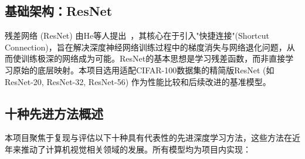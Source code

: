\documentclass[a4paper]{article}
\begin{document}
\subsection{基础架构：ResNet}
残差网络 (ResNet) 由He等人提出~\cite{he2016deep}，其核心在于引入"快捷连接"(Shortcut Connection)，旨在解决深度神经网络训练过程中的梯度消失与网络退化问题，从而使训练极深的网络成为可能。ResNet的基本思想是学习残差函数，而非直接学习原始的底层映射。本项目选用适配CIFAR-100数据集的精简版ResNet (如ResNet-20, ResNet-32, ResNet-56) 作为性能比较和后续改进的基准模型。

\subsection{十种先进方法概述}
本项目聚焦于复现与评估以下十种具有代表性的先进深度学习方法，这些方法在近年来推动了计算机视觉相关领域的发展。所有模型均为项目内实现：
\end{document}
